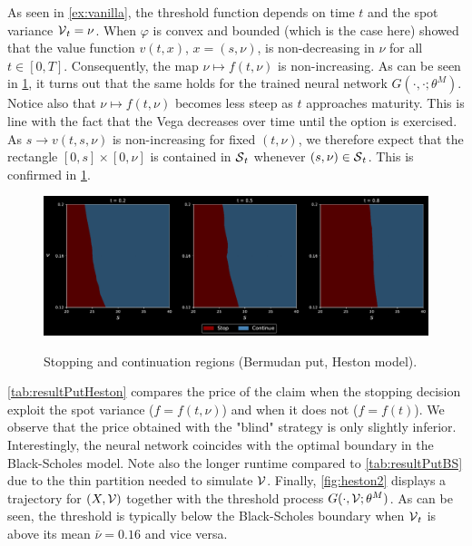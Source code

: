 As seen in \cref{ex:vanilla}, the threshold function 
depends on time $t$ and the spot variance $\operatorname{\mathcal{V}}_t =\nu$.  
When $\varphi$ is convex and bounded (which is the case here)   \citet{LambertonHeston} showed that the value function $v(t,x)$, $x=(s,\nu)$, is  non-decreasing in $\nu$ for all $t\in [0,T]$. Consequently, the map $\nu \mapsto f(t,\nu)$ is non-increasing. As can be seen in  \cref{fig:heston1}, it turns out that the same holds for the trained neural network $G(\cdot,\cdot;\theta^M)$.
Notice also that $\nu \mapsto f(t,\nu)$ becomes less steep as $t$ approaches maturity. This is line with the fact that the Vega  decreases over time until the option is exercised.  
As $s \to v(t,s,\nu)$ is non-increasing for fixed $(t,\nu)$,  we therefore expect that the  rectangle $[0,s]\times [0,\nu]$ 
is contained in $\operatorname{\mathcal{S}}_t$ whenever $(s,\nu) \in \operatorname{\mathcal{S}}_t$. This is confirmed in  \cref{fig:heston1}. 

 
\begin{figure}[H]
    \centering
     \caption{Stopping and continuation regions (Bermudan put, Heston model).}
    \includegraphics[scale = 0.42]{Figures/2DPlotHestonWide.pdf}
    \label{fig:heston1}
\end{figure}

 \cref{tab:resultPutHeston} compares the price of the claim when the stopping decision exploit the spot variance ($f = f(t,\nu)$) and when it does not ($f = f(t)$). We observe that the price obtained with the "blind" strategy is only slightly inferior. Interestingly, the neural network coincides with the optimal boundary in the Black-Scholes model.  Note also the longer runtime compared to \cref{tab:resultPutBS} due to the thin partition needed to simulate $\operatorname{\mathcal{V}}$. %
 Finally, \cref{fig:heston2} displays a trajectory for $(X,\operatorname{\mathcal{V}})$ together with the threshold process $G(\cdot,\operatorname{\mathcal{V}};\theta^M)$. As can be seen, the threshold is typically below the Black-Scholes boundary when $\operatorname{\mathcal{V}}_t$ is above its mean $\bar{\nu} = 0.16$ and vice versa. 

